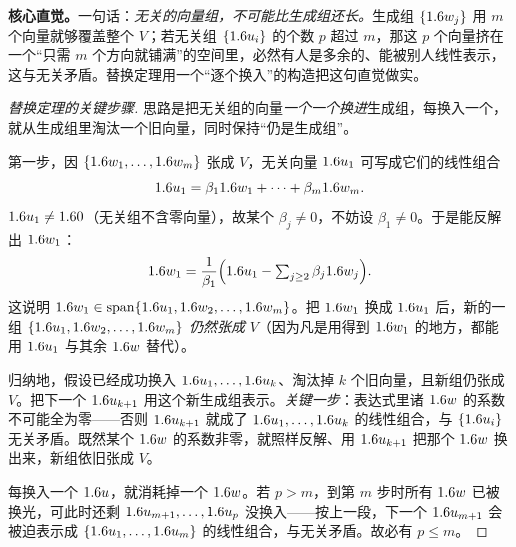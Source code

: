 
\noindent\textbf{核心直觉。}一句话：\emph{无关的向量组，不可能比生成组还长。}生成组 $\{1.6 w_j\}$ 用 $m$ 个向量就够覆盖整个 $V$；若无关组 $\{1.6 u_i\}$ 的个数 $p$ 超过 $m$，那这 $p$ 个向量挤在一个``只需 $m$ 个方向就铺满''的空间里，必然有人是多余的、能被别人线性表示，这与无关矛盾。替换定理用一个``逐个换入''的构造把这句直觉做实。

\begin{proof}[替换定理的关键步骤]
思路是把无关组的向量\emph{一个一个换进}生成组，每换入一个，就从生成组里淘汰一个旧向量，同时保持``仍是生成组''。

第一步，因 $\{1.6 w_1,\dots,1.6 w_m\}$ 张成 $V$，无关向量 $1.6 u_1$ 可写成它们的线性组合
\[
    1.6 u_1=\beta_11.6 w_1+\cdots+\beta_m1.6 w_m .
\]
$1.6 u_1\neq1.6 0$（无关组不含零向量），故某个 $\beta_j\neq 0$，不妨设 $\beta_1\neq 0$。于是能反解出 $1.6 w_1$：
\[
    1.6 w_1=\frac{1}{\beta_1}\Bigl(1.6 u_1-\textstyle\sum_{j\ge 2}\beta_j1.6 w_j\Bigr).
\]
这说明 $1.6 w_1\in\operatorname{span}\{1.6 u_1,1.6 w_2,\dots,1.6 w_m\}$。把 $1.6 w_1$ 换成 $1.6 u_1$ 后，新的一组 $\{1.6 u_1,1.6 w_2,\dots,1.6 w_m\}$ \emph{仍然张成} $V$（因为凡是用得到 $1.6 w_1$ 的地方，都能用 $1.6 u_1$ 与其余 $1.6 w$ 替代）。

归纳地，假设已经成功换入 $1.6 u_1,\dots,1.6 u_{k}$、淘汰掉 $k$ 个旧向量，且新组仍张成 $V$。把下一个 $1.6 u_{k+1}$ 用这个新生成组表示。\emph{关键一步}：表达式里诸 $1.6 w$ 的系数不可能全为零——否则 $1.6 u_{k+1}$ 就成了 $1.6 u_1,\dots,1.6 u_k$ 的线性组合，与 $\{1.6 u_i\}$ 无关矛盾。既然某个 $1.6 w$ 的系数非零，就照样反解、用 $1.6 u_{k+1}$ 把那个 $1.6 w$ 换出来，新组依旧张成 $V$。

每换入一个 $1.6 u$，就消耗掉一个 $1.6 w$。若 $p>m$，到第 $m$ 步时所有 $1.6 w$ 已被换光，可此时还剩 $1.6 u_{m+1},\dots,1.6 u_p$ 没换入——按上一段，下一个 $1.6 u_{m+1}$ 会被迫表示成 $\{1.6 u_1,\dots,1.6 u_m\}$ 的线性组合，与无关矛盾。故必有 $p\le m$。
\end{proof}



